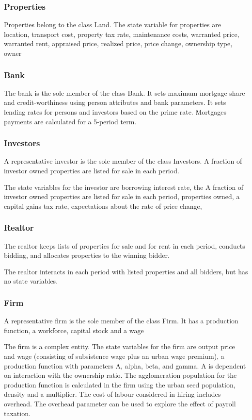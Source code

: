\subsubsection{Properties}
Properties belong to the class Land. The state variable  for properties are location, transport cost, property tax rate, maintenance costs, warranted price, warranted rent, appraised price, realized price, price change, ownership type, owner  

\subsubsection{Bank}
The bank is the sole member of the class Bank. It sets maximum mortgage share and credit-worthiness using person attributes and bank parameters. It sets lending rates for persons and investors based on the prime rate. Mortgages payments are calculated for a 5-period term.
 
\subsubsection{Investors}
A representative  investor is the sole member of the class Investors.   A fraction of investor owned properties are listed  for sale in each period.

The state variables  for the investor are borrowing interest rate, the A fraction of investor owned properties are listed  for sale in each period, properties owned, a capital gains tax rate, expectations about the rate of price change,

\subsubsection{Realtor}
The realtor keeps lists of properties for sale and for rent in each period, conducts bidding, and allocates properties to the winning bidder.

The realtor interacts in each period with listed properties and  all bidders, but has no state variables.


\subsubsection{Firm}
A representative firm is the sole member of the class Firm. It has a production function, a workforce, capital stock and a wage 

The firm is a complex entity. The state variables for the firm are output price and wage (consisting of subsistence wage plus an urban wage premium), a production function with parameters  A, alpha, beta, and gamma. A is dependent on interaction with the ownership ratio. The agglomeration population for the production function is calculated in the firm using the urban seed population, density and a multiplier. The cost of labour considered in hiring includes overhead. The overhead parameter can be used to explore the effect of payroll taxation.

